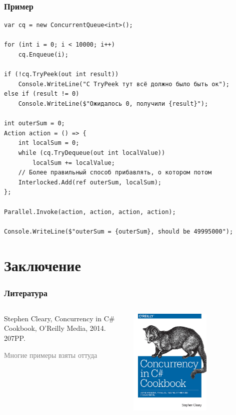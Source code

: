 \documentclass[xetex,mathserif,serif]{beamer}
\begin{document}
	\begin{frame}[fragile]
		\frametitle{Пример}
		\begin{scriptsize}
			\begin{verbatim}
var cq = new ConcurrentQueue<int>();

for (int i = 0; i < 10000; i++) 
    cq.Enqueue(i);

if (!cq.TryPeek(out int result))
    Console.WriteLine("С TryPeek тут всё должно было быть ок");
else if (result != 0)
    Console.WriteLine($"Ожидалось 0, получили {result}");

int outerSum = 0;
Action action = () => {
    int localSum = 0;
    while (cq.TryDequeue(out int localValue)) 
        localSum += localValue;
    // Более правильный способ прибавлять, о котором потом
    Interlocked.Add(ref outerSum, localSum);
};

Parallel.Invoke(action, action, action, action);

Console.WriteLine($"outerSum = {outerSum}, should be 49995000");
			\end{verbatim}
		\end{scriptsize}
	\end{frame}

	\section{Заключение}

	\begin{frame}
		\frametitle{Литература}
		\begin{columns}
			\begin{column}{0.6\textwidth}
				Stephen Cleary, Concurrency in C\# Cookbook, O'Reilly Media, 2014. 207PP.

				\textcolor{gray}{Многие примеры взяты оттуда}
			\end{column}
			\begin{column}{0.4\textwidth}
				\begin{center}
					\includegraphics[width=0.6\textwidth]{concurrencyCookbookCover.png}
				\end{center}
			\end{column}
		\end{columns}
	\end{frame}
\end{document}
